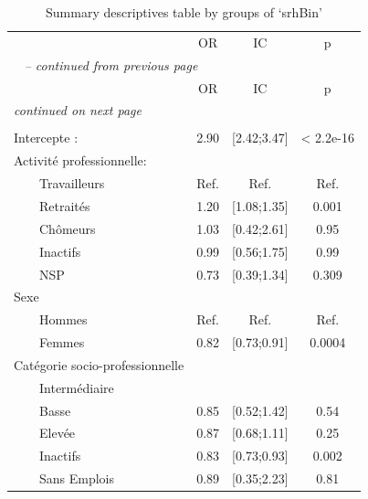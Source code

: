 \documentclass{book}
\begin{document}
    \begin{longtable}{lccc}\caption{Summary descriptives table by groups of `srhBin'}\\
    \hline  
     &                \multirow{2}{*}{OR}    & \multirow{2}{*}{IC} & \multirow{2}{*}{p}\\ 
 &     &                        &         \\ 
  
    \hline
    \hline     
    \endfirsthead 
    \multicolumn{4}{l}{\tablename\ \thetable{} \textit{-- continued from previous page}}\\ 
    \hline
    &                     \multirow{2}{*}{OR}    & \multirow{2}{*}{IC} & \multirow{2}{*}{p}\\ 
 &     &                     &         \\ 

    \hline
    \hline  
    \endhead   
    \hline
    \multicolumn{4}{l}{\textit{continued on next page}} \\ 
    \endfoot   
    \multicolumn{4}{l}{}  \\ 
    \endlastfoot

Intercepte : &2.90 & [2.42;3.47] &< 2.2e-16 \\    
Activité professionnelle:  &         &              &                         \\ 
$\qquad$Travailleurs & Ref.& Ref. & Ref.             \\ 
$\qquad$Retraités &1.20&[1.08;1.35] &0.001\\
$\qquad$Chômeurs   & 1.03& [0.42;2.61]& 0.95\\ 
$\qquad$Inactifs &0.99& [0.56;1.75] &0.99\\
$\qquad$NSP  &0.73&[0.39;1.34] &0.309\\ 

Sexe&&&\\
$\qquad$Hommes & Ref.& Ref. & Ref.             \\
$\qquad$Femmes &0.82 &[0.73;0.91] &0.0004\\
 
Catégorie socio-professionnelle&&&\\
$\qquad$Intermédiaire&&&\\
$\qquad$Basse &0.85& [0.52;1.42] &0.54\\ 
$\qquad$Elevée &0.87& [0.68;1.11] &0.25\\ 
$\qquad$Inactifs   &0.83& [0.73;0.93] &0.002\\
$\qquad$Sans Emplois &0.89 &[0.35;2.23] &0.81\\


\end{longtable}
\end{document}
